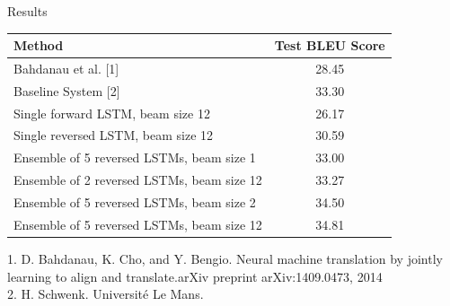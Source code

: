 \documentclass{beamer}
\begin{document}
\begin{frame}{Results}
\begin{table}[]
    \centering
    \begin{tabular}{|l|c|}
    \hline
       \textbf{Method} & \textbf{Test BLEU Score}\\
       \hline
       Bahdanau et al. [1] & 28.45\\
       \hline
       Baseline System [2] & 33.30\\
       \hline
       Single forward LSTM, beam size 12 & 26.17\\
       \hline
       Single reversed LSTM, beam size 12 & 30.59\\
       \hline
       Ensemble of 5 reversed LSTMs, beam size 1 & 33.00\\
       \hline
       Ensemble of 2 reversed LSTMs, beam size 12 & 33.27\\
       \hline
       Ensemble of 5 reversed LSTMs, beam size 2 & 34.50\\
       \hline
       Ensemble of 5 reversed LSTMs, beam size 12 & 34.81\\
       \hline
    \end{tabular}
\end{table}  


\footnotesize{1. D. Bahdanau, K. Cho, and Y. Bengio. Neural machine translation by jointly learning to align and translate.arXiv preprint arXiv:1409.0473, 2014\\
2.  H.  Schwenk.   Universit\'e  Le Mans.}



\end{frame}
\end{document}
